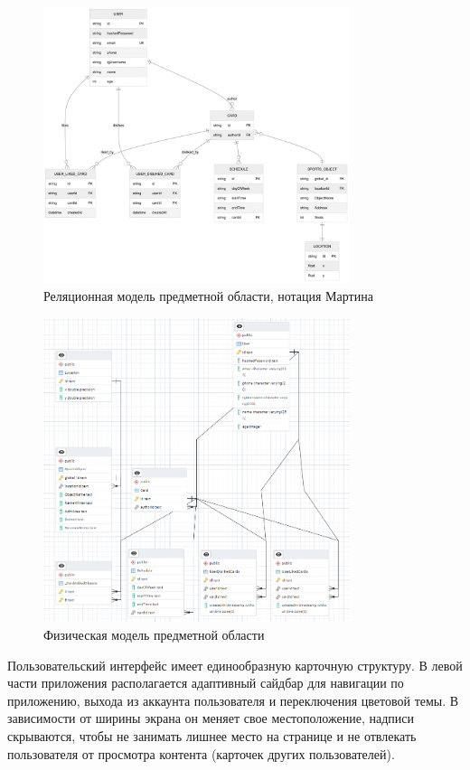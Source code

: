 \documentclass[14pt]{article}
\begin{document}
\begin{figure}[H!]
	\centering
	\includegraphics[width=0.8\textwidth]{fig2.png}
	\caption{Реляционная модель предметной области, нотация Мартина}
\end{figure}

\begin{figure}[H!]
	\centering
	\includegraphics[width=0.8\textwidth]{fig3.png}
	\caption{Физическая модель предметной области}
\end{figure}

Пользовательский интерфейс имеет единообразную карточную структуру.
В левой части приложения располагается адаптивный сайдбар для навигации по приложению, выхода из
аккаунта пользователя и переключения цветовой темы. В зависимости от ширины экрана он меняет свое местоположение,
надписи скрываются, чтобы не занимать лишнее место на странице и не отвлекать пользователя от просмотра контента (карточек других пользователей).
\end{document}
